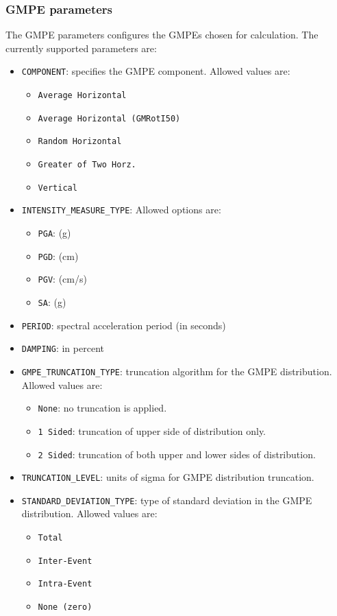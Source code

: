 \subsubsection{GMPE parameters}
The GMPE parameters configures the GMPEs chosen for calculation. The currently supported parameters are:
\begin{itemize}
\item \Verb+COMPONENT+: specifies the GMPE component. Allowed values are:
\begin{itemize}
\item \Verb+Average Horizontal+
\item \Verb+Average Horizontal (GMRotI50)+
\item \Verb+Random Horizontal+
\item \Verb+Greater of Two Horz.+
\item \Verb+Vertical+
\end{itemize}
\item \Verb+INTENSITY_MEASURE_TYPE+: Allowed options are:
\begin{itemize}
\item \Verb+PGA+: (g)
\item \Verb+PGD+: (cm)
\item \Verb+PGV+: (cm/s)
\item \Verb+SA+: (g)
\end{itemize}
\item \Verb+PERIOD+: spectral acceleration period (in seconds)
\item \Verb+DAMPING+: in percent
\item \Verb+GMPE_TRUNCATION_TYPE+: truncation algorithm for the GMPE distribution. Allowed values are:
\begin{itemize}
\item \Verb+None+: no truncation is applied.
\item \Verb+1 Sided+: truncation of upper side of distribution only.
\item \Verb+2 Sided+: truncation of both upper and lower sides of distribution.
\end{itemize}
\item \Verb+TRUNCATION_LEVEL+: units of sigma for GMPE distribution truncation.
\item \Verb+STANDARD_DEVIATION_TYPE+: type of standard deviation in the GMPE distribution. Allowed values are:
\begin{itemize}
\item \Verb+Total+
\item \Verb+Inter-Event+
\item \Verb+Intra-Event+
\item \Verb+None (zero)+
\end{itemize}
\end{itemize}

